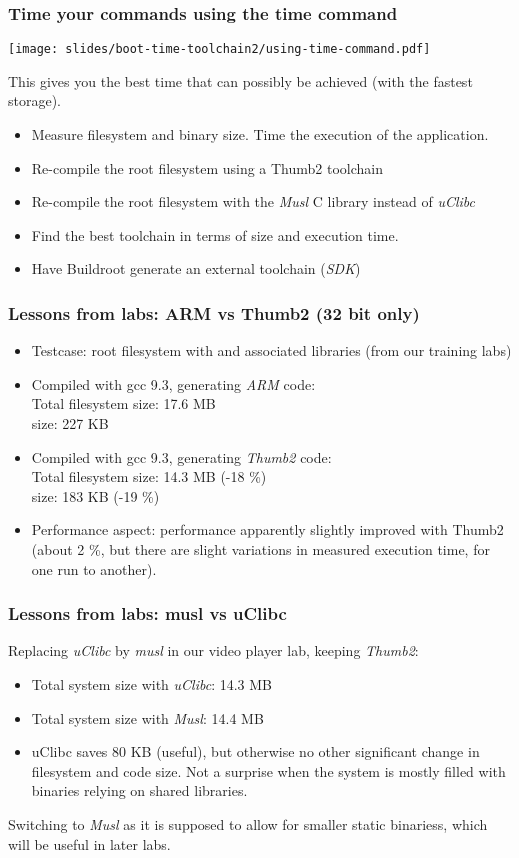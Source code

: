 \begin{frame}
\frametitle{Time your commands using the time command}
\begin{center}
\texttt{[image: slides/boot-time-toolchain2/using-time-command.pdf]}
\end{center}
This gives you the best time that can possibly be achieved (with the fastest storage).
\end{frame}

{
\begin{itemize}
\item Measure filesystem and  binary size. Time
      the execution of the application.
\item Re-compile the root filesystem using a Thumb2 toolchain
\item Re-compile the root filesystem with the {\em Musl}
      C library instead of {\em uClibc}
\item Find the best toolchain in terms of size and execution time.
\item Have Buildroot generate an external toolchain ({\em SDK})
\end{itemize}
}


\begin{frame}
\frametitle{Lessons from labs: ARM vs Thumb2 (32 bit only)}
\begin{itemize}
\item Testcase: root filesystem with  and associated
      libraries (from our training labs)
\item Compiled with gcc 9.3, generating {\em ARM} code:\\
      Total filesystem size: 17.6 MB\\
       size: 227 KB
\item Compiled with gcc 9.3, generating {\em Thumb2} code:\\
      Total filesystem size: 14.3 MB (-18 \%)\\
       size: 183 KB (-19 \%)
\item Performance aspect: performance apparently slightly improved with Thumb2
      (about 2 \%, but there are slight variations in measured
      execution time, for one run to another).
\end{itemize}
\end{frame}

\begin{frame}
\frametitle{Lessons from labs: musl vs uClibc}
Replacing {\em uClibc} by {\em musl} in our video player lab, keeping
{\em Thumb2}:
\begin{itemize}
   \item Total system size with {\em uClibc}: 14.3 MB
   \item Total system size with {\em Musl}: 14.4 MB
   \item uClibc saves 80 KB (useful), but otherwise no other significant change
    in filesystem and code size. Not a surprise when the system is mostly filled
    with binaries relying on shared libraries.
\end{itemize}
Switching to {\em Musl} as it is supposed to allow for smaller static
binariess, which will be useful in later labs.
\end{frame}
